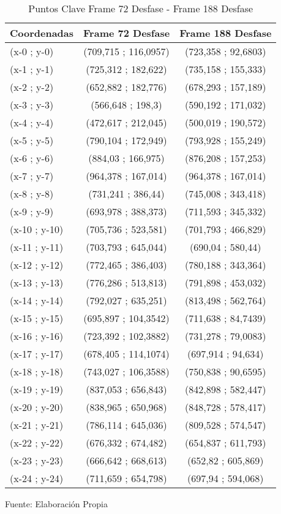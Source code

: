 \begin{table}[htbp]
	\centering
	\begin{tabular}{|l|c|c|}
		\hline
		Coordenadas &Frame 72 Desfase &	Frame 188 Desfase \\ \hline 
		(x-0 ; y-0) & (709,715 ; 116,0957) & (723,358 ; 92,6803) \\
		(x-1 ; y-1) & (725,312 ; 182,622) & (735,158 ; 155,333) \\
		(x-2 ; y-2) & (652,882 ; 182,776) & (678,293 ; 157,189) \\
		(x-3 ; y-3) & (566,648 ; 198,3) & (590,192 ; 171,032) \\
		(x-4 ; y-4) & (472,617 ; 212,045) & (500,019 ; 190,572) \\
		(x-5 ; y-5) & (790,104 ; 172,949) & (793,928 ; 155,249) \\
		(x-6 ; y-6) & (884,03 ; 166,975) & (876,208 ; 157,253) \\
		(x-7 ; y-7) & (964,378 ; 167,014) & (964,378 ; 167,014) \\
		(x-8 ; y-8) & (731,241 ; 386,44) & (745,008 ; 343,418) \\
		(x-9 ; y-9) & (693,978 ; 388,373) & (711,593 ; 345,332) \\
		(x-10 ; y-10) & (705,736 ; 523,581) & (701,793 ; 466,829) \\
		(x-11 ; y-11) & (703,793 ; 645,044) & (690,04 ; 580,44) \\
		(x-12 ; y-12) & (772,465 ; 386,403) & (780,188 ; 343,364) \\
		(x-13 ; y-13) & (776,286 ; 513,813) & (791,898 ; 453,032) \\
		(x-14 ; y-14) & (792,027 ; 635,251) & (813,498 ; 562,764) \\
		(x-15 ; y-15) & (695,897 ; 104,3542) & (711,638 ; 84,7439) \\
		(x-16 ; y-16) & (723,392 ; 102,3882) & (731,278 ; 79,0083) \\
		(x-17 ; y-17) & (678,405 ; 114,1074) & (697,914 ; 94,634) \\
		(x-18 ; y-18) & (743,027 ; 106,3588) & (750,838 ; 90,6595) \\
		(x-19 ; y-19) & (837,053 ; 656,843) & (842,898 ; 582,447) \\
		(x-20 ; y-20) & (838,965 ; 650,968) & (848,728 ; 578,417) \\
		(x-21 ; y-21) & (786,114 ; 645,036) & (809,528 ; 574,547) \\
		(x-22 ; y-22) & (676,332 ; 674,482) & (654,837 ; 611,793) \\
		(x-23 ; y-23) & (666,642 ; 668,613) & (652,82 ; 605,869) \\
		(x-24 ; y-24) & (711,659 ; 654,798) & (697,94 ; 594,068) \\ \hline
	\end{tabular}%
\caption{Puntos Clave Frame 72 Desfase - Frame 188 Desfase}
\footnotesize Fuente:  Elaboración Propia
\label{checkeroriginalpart4}
\end{table}%



